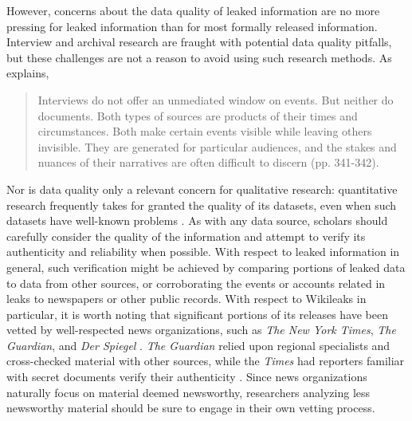 \documentclass[12pt]{article}
\begin{document}
However, concerns about the data quality of leaked information are no more pressing for 
leaked information than for most formally released information. Interview and archival research are 
fraught with potential data quality pitfalls, but these challenges are not a reason to avoid 
using such research methods. As \citet{hecht2012being} explains,
\begin{quote}
Interviews do not offer an unmediated window on events. But neither do documents. Both 
types of sources are products of their times and circumstances. Both make certain events visible while 
leaving others invisible. They are generated for particular audiences, and the stakes and nuances 
of their narratives are often difficult to discern (pp. 341-342).
\end{quote}
Nor is data quality only a relevant concern for qualitative research: 
quantitative research frequently takes for granted the quality of its datasets, even 
when such datasets have well-known problems \citep{herrera2007improving}.
As with any data source, scholars should 
carefully consider the quality of the information and attempt to verify its authenticity and 
reliability when possible. With respect to leaked information in general, such verification might be 
achieved by 
comparing portions of leaked data to data from other sources, or corroborating the events or accounts related 
in leaks to newspapers or other public records.
With respect to Wikileaks in particular, it is worth noting that significant portions of its releases  
have been vetted by well-respected news organizations, such as \emph{The New York Times}, 
\emph{The Guardian}, and \emph{Der Spiegel} \citep{debevec2010professor:}. 
\emph{The Guardian} relied upon regional specialists and cross-checked material with other sources, while
the \emph{Times} had reporters familiar with secret documents verify their 
authenticity \citep{kirchner2010gaining,michael_morisy2010bill}. Since news organizations naturally focus on 
material deemed newsworthy, researchers analyzing less newsworthy material should be sure to engage in 
their own vetting process.
\end{document}
